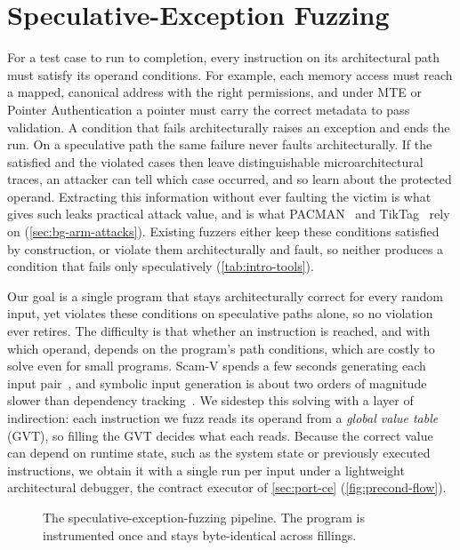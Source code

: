 \chapter{Speculative-Exception Fuzzing}
\label{chap:precond}

For a test case to run to completion, every instruction on its architectural path must satisfy
its operand conditions. For example, each memory access must reach a mapped, canonical address with
the right permissions, and under MTE or Pointer Authentication a pointer must carry the correct
metadata to pass validation. A condition that fails architecturally raises an exception and ends
the run. On a speculative path the same failure never faults architecturally. If the satisfied and
the violated cases then leave distinguishable microarchitectural traces, an attacker can tell which
case occurred, and so learn about the protected operand. Extracting this information without ever
faulting the victim is what gives such leaks practical attack value, and is what
PACMAN~\cite{pacman} and TikTag~\cite{tiktag} rely on (\autoref{sec:bg-arm-attacks}). Existing
fuzzers either keep these conditions satisfied by construction, or violate them architecturally and
fault, so neither produces a condition that fails only speculatively (\autoref{tab:intro-tools}).

Our goal is a single program that stays architecturally correct for every random input, yet
violates these conditions on speculative paths alone, so no violation ever retires. The difficulty
is that whether an instruction is reached, and with which operand, depends on the program's path
conditions, which are costly to solve even for small programs. Scam-V spends a few seconds
generating each input pair~\cite{scamv_micro}, and symbolic input generation is about two orders of
magnitude slower than dependency tracking~\cite{hide_seek}. We sidestep this solving with a layer of
indirection: each instruction we fuzz reads its operand from a \emph{global value table} (GVT), so
filling the GVT decides what each reads. Because the correct value can depend on runtime state, such
as the system state or previously executed instructions, we obtain it with a single run per input
under a lightweight architectural debugger, the contract executor of \autoref{sec:port-ce}
(\autoref{fig:precond-flow}).

\begin{figure}[t]
\centering
\fitwidth{}
\caption{The speculative-exception-fuzzing pipeline. The program is instrumented once and stays
byte-identical across fillings.}
\label{fig:precond-flow}
\end{figure}

